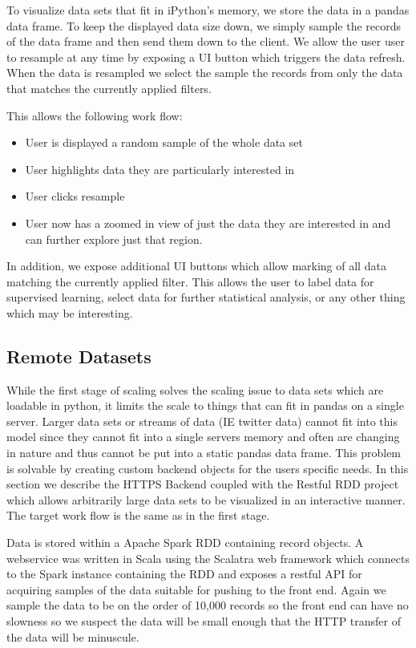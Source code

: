 \documentclass[letter,twocolumn]{article}
\begin{document}
To visualize data sets that fit in iPython's memory, we store the data in a pandas data frame.
To keep the displayed data size down, we simply sample the records of the data frame and then send them down to the client.
We allow the user user to resample at any time by exposing a UI button which triggers the data refresh.
When the data is resampled we select the sample the records from only the data that matches the currently applied filters.

This allows the following work flow:
\begin{itemize}
	\item User is displayed a random sample of the whole data set
	\item User highlights data they are particularly interested in
	\item User clicks resample
	\item User now has a zoomed in view of just the data they are interested in and can further explore just that region.
\end{itemize}

In addition, we expose additional UI buttons which allow marking of all data matching the currently applied filter.
This allows the user to label data for supervised learning, select data for further statistical analysis, or any other thing which may be interesting.

\subsection{Remote Datasets}\label{sec:big_data_remote}

While the first stage of scaling solves the scaling issue to data sets which are loadable in python, it limits the scale to things that can fit in pandas on a single server.
Larger data sets or streams of data (IE twitter data) cannot fit into this model since they cannot fit into a single servers memory and often are changing in nature and thus cannot be put into a static pandas data frame.
This problem is solvable by creating custom backend objects for the users specific needs.
In this section we describe the HTTPS Backend coupled with the Restful RDD project which allows arbitrarily large data sets to be visualized in an interactive manner.
The target work flow is the same as in the first stage.

Data is stored within a Apache Spark RDD containing record objects.  A webservice was written in Scala using the Scalatra web framework which connects to the Spark instance containing the RDD and exposes a restful API for acquiring samples of the data suitable for pushing to the front end.  Again we sample the data to be on the order of 10,000 records so the front end can have no slowness so we suspect the data will be small enough that the HTTP transfer of the data will be minuscule.
\end{document}

